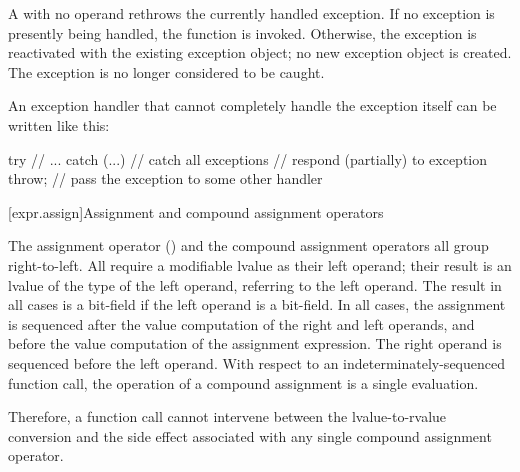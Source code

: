 \pnum
{}%
A
with no operand rethrows the currently handled exception.
%
%
If no exception is presently being handled,
the function  is invoked.
Otherwise, the exception is reactivated with the existing exception object;
no new exception object is created.
The exception is no longer considered to be caught.
\begin{example}
An exception handler that cannot completely handle the exception itself
can be written like this:
\begin{codeblock}
try {
  // ...
} catch (...) {     // catch all exceptions
  // respond (partially) to exception
  throw;            // pass the exception to some other handler
}
\end{codeblock}
\end{example}

[expr.assign]{Assignment and compound assignment operators}%

\pnum
{}%
%
%
%
%
%
%
%
%
%
%
%
The assignment operator (\tcode{=}) and the compound assignment
operators all group right-to-left.
%
All
require a modifiable lvalue as their left operand; their result is an lvalue
of the type of the left operand, referring to the left operand. The result in all cases is a bit-field if
the left operand is a bit-field. In all cases, the assignment is
sequenced after the
%
value computation of the right and left operands,
and before the
value computation of the assignment expression.
The right operand is sequenced before the left operand.
With
respect to an indeterminately-sequenced function call, the operation of
a compound assignment is a single evaluation.
\begin{note}
Therefore, a function call cannot intervene between the
lvalue-to-rvalue conversion and the side effect associated with any
single compound assignment operator.
\end{note}

